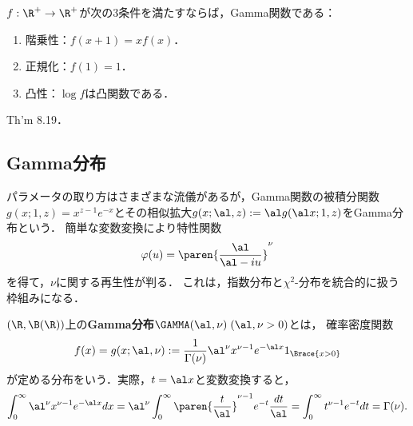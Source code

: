 \documentclass[uplatex,dvipdfmx]{jsreport}
\begin{document}
\begin{theorem}\label{thm-characterization-of-Gamma-function}
    $f:\R^+\to\R^+$が次の3条件を満たすならば，Gamma関数である：
    \begin{enumerate}
        \item 階乗性：$f(x+1)=xf(x)$．
        \item 正規化：$f(1)=1$．
        \item 凸性：$\log f$は凸関数である．
    \end{enumerate}
\end{theorem}
\begin{Proof}
    \cite{Rudin-Principles} Th'm 8.19．
\end{Proof}

\subsection{Gamma分布}

\begin{tcolorbox}[colframe=ForestGreen, colback=ForestGreen!10!white,breakable,colbacktitle=ForestGreen!40!white,coltitle=black,fonttitle=\bfseries\sffamily,
title=]
    パラメータの取り方はさまざまな流儀があるが，Gamma関数の被積分関数$g(x;1,z)=x^{z-1}e^{-x}$とその相似拡大$g(x;\al,z):=\al g(\al x;1,z)$をGamma分布という．
    簡単な変数変換により特性関数
    \[\varphi(u)=\paren{\frac{\al}{\al-iu}}^{\nu}\]
    を得て，$\nu$に関する再生性が判る．
    これは，指数分布と$\chi^2$-分布を統合的に扱う枠組みになる．
\end{tcolorbox}

\begin{definition}
    $(\R,\B(\R))$上の\textbf{Gamma分布}$\GAMMA(\al,\nu)\;(\al,\nu>0)$とは，
    確率密度関数
    \[f(x)=g(x;\al,\nu):=\frac{1}{\Gamma(\nu)}\al^\nu x^{\nu-1}e^{-\al x}1_{\Brace{x>0}}\]
    が定める分布をいう．実際，$t=\al x$と変数変換すると，
    \[\int_0^\infty \al^\nu x^{\nu-1}e^{-\al x}dx=\al^\nu\int^\infty_0\paren{\frac{t}{\al}}^{\nu-1}e^{-t}\frac{dt}{\al}=\int^\infty_0t^{\nu-1}e^{-t}dt=\Gamma(\nu).\]
\end{definition}
\end{document}
